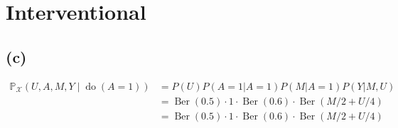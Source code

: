 \documentclass[10pt]{article}
\begin{document}



\section{Interventional}
\subsection{(c)}

\begin{align*}
\mathbb{P}_{\mathcal{X}}(U, A, M, Y \mid \operatorname{do}(A=1)) &=  P(U)P(A=1|A=1)P(M|A=1)P(Y|M, U)\\
&= \operatorname{Ber}(0.5)\cdot1\cdot\operatorname{Ber}(0.6)\cdot\operatorname{Ber}(M/2 + U/4)\\
&= \operatorname{Ber}(0.5)\cdot1\cdot\operatorname{Ber}(0.6)\cdot\operatorname{Ber}(M/2 + U/4)
\end{align*}    
\end{document}
